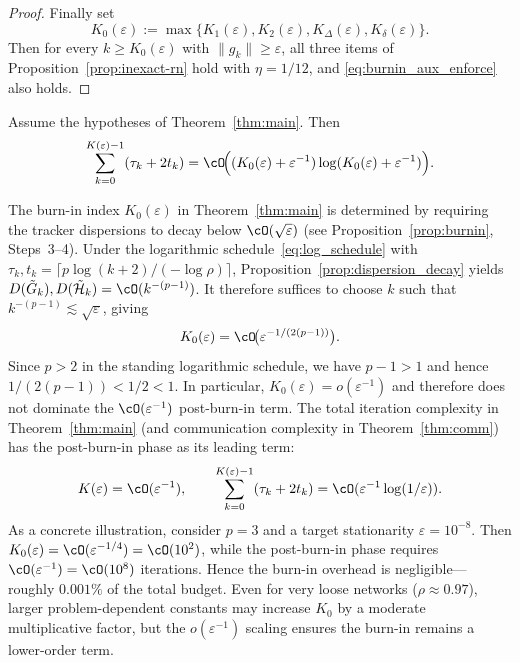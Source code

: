 \documentclass[review,onefignum,onetabnum]{siamart171218}
\begin{document}
\begin{proof}
		\smallskip
		Finally set
		\[
		K_0(\varepsilon):=\max\{K_1(\varepsilon),K_2(\varepsilon),K_\Delta(\varepsilon),K_\delta(\varepsilon)\}.
		\]
		Then for every $k\ge K_0(\varepsilon)$ with $\|g_k\|\ge \varepsilon$, all three items of Proposition~\ref{prop:inexact-rn} hold with $\eta=1/12$,
		and \eqref{eq:burnin_aux_enforce} also holds.
	\end{proof}
	
	\begin{theorem}\label{thm:comm}
		Assume the hypotheses of Theorem~\ref{thm:main}. Then
		\[
		\sum_{k=0}^{K(\varepsilon)-1}(\tau_k+2t_k)
		=\cO\!\Big((K_0(\varepsilon)+\varepsilon^{-1})\log(K_0(\varepsilon)+\varepsilon^{-1})\Big).
		\]
	\end{theorem}
	
	\begin{remark}\label{rem:burnin_order_app}
		The burn-in index $K_0(\varepsilon)$ in Theorem~\ref{thm:main} is
		determined by requiring the tracker dispersions to decay below
		$\cO(\sqrt\varepsilon)$ (see Proposition~\ref{prop:burnin}, Steps~3--4).
		Under the logarithmic schedule~\eqref{eq:log_schedule} with
		$\tau_k,t_k=\lceil p\log(k+2)/(-\log\rho)\rceil$,
		Proposition~\ref{prop:dispersion_decay} yields
		$D(\tilde G_k),D(\tilde{\mathcal H}_k)=\cO(k^{-(p-1)})$.
		It therefore suffices to choose $k$ such that $k^{-(p-1)}\lesssim\sqrt\varepsilon$,
		giving
		\[
		K_0(\varepsilon)=\cO\!\big(\varepsilon^{-1/(2(p-1))}\big).
		\]
		Since $p>2$ in the standing logarithmic schedule, we have $p-1>1$
		and hence $1/(2(p-1))<1/2<1$.
		In particular, $K_0(\varepsilon)=o(\varepsilon^{-1})$ and therefore
		does not dominate the $\cO(\varepsilon^{-1})$ post-burn-in term.
		The total iteration complexity in Theorem~\ref{thm:main}
		(and communication complexity in Theorem~\ref{thm:comm}) has the
		post-burn-in phase as its leading term:
		\[
		K(\varepsilon)=\cO(\varepsilon^{-1}),
		\qquad
		\sum_{k=0}^{K(\varepsilon)-1}(\tau_k+2t_k)
		=\cO(\varepsilon^{-1}\log(1/\varepsilon)).
		\]
		As a concrete illustration, consider $p=3$ and a target stationarity
		$\varepsilon=10^{-8}$.
		Then $K_0(\varepsilon)=\cO(\varepsilon^{-1/4})=\cO(10^{2})$,
		while the post-burn-in phase requires $\cO(\varepsilon^{-1})=\cO(10^{8})$
		iterations.
		Hence the burn-in overhead is negligible---roughly $0.001\%$
		of the total budget.
		Even for very loose networks ($\rho\approx0.97$), larger
		problem-dependent constants may increase $K_0$ by a moderate
		multiplicative factor, but the $o(\varepsilon^{-1})$ scaling ensures
		the burn-in remains a lower-order term.
	\end{remark}
	
\end{document}
